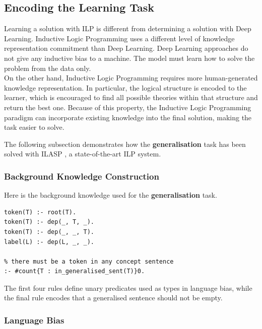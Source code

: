 \subsection{Encoding the Learning Task}
\label{encoding-the-learning-task}

Learning a solution with ILP is different from determining a solution with Deep Learning.
Inductive Logic Programming uses a different level of knowledge representation commitment than Deep Learning.
Deep Learning approaches do not give any inductive bias to a machine. 
The model must learn how to solve the problem from the data only. \\
On the other hand, Inductive Logic Programming requires more human-generated knowledge representation.
In particular, the logical structure is encoded to the learner, which is encouraged to find all possible theories within that structure and return the best one. 
Because of this property, the Inductive Logic Programming paradigm can incorporate existing knowledge into the final solution, making the task easier to solve.

The following subsection demonstrates how the \textbf{generalisation} task has been solved with ILASP \cite{RefWorks:RefID:18-law2020ilasp}, a state-of-the-art ILP system.


\subsubsection{Background Knowledge Construction}

Here is the background knowledge used for the \textbf{generalisation} task.
\begin{verbatim}
token(T) :- root(T).
token(T) :- dep(_, T, _).
token(T) :- dep(_, _, T).
label(L) :- dep(L, _, _).

% there must be a token in any concept sentence
:- #count{T : in_generalised_sent(T)}0.
\end{verbatim}
The first four rules define unary predicates used as types in language bias, while the final rule encodes that a generalised sentence should not be empty.

\subsubsection{Language Bias}

